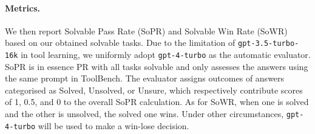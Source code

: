 \paragraph{Metrics.}
We then report Solvable Pass Rate (SoPR) and Solvable Win Rate (SoWR) based on our obtained solvable tasks.
Due to the limitation of \texttt{gpt-3.5-turbo-16k} in tool learning, we uniformly adopt \texttt{gpt-4-turbo} as the automatic evaluator.
SoPR is in essence PR with all tasks solvable and only assesses the answers using the same prompt in ToolBench.
The evaluator assigns outcomes of answers categorised as Solved, Unsolved, or Unsure, which respectively contribute scores of 1, 0.5, and 0 to the overall SoPR calculation.
As for SoWR, when one is solved and the other is unsolved, the solved one wins.
Under other circumstances, \texttt{gpt-4-turbo} will be used to make a win-lose decision.  








